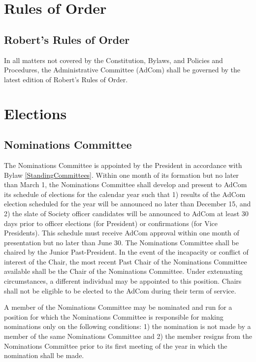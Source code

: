 \documentclass[10pt]{article}
\newcommand{\blref}[1]{Bylaw \ref{#1}}
\begin{document}
\tableofcontents

\section{Rules of Order}
\subsection{Robert's Rules of Order}

In all matters not covered by the Constitution, Bylaws, and Policies and Procedures, the Administrative Committee (AdCom) shall be governed by the latest edition of Robert's Rules of Order.

\section{Elections}
\subsection{Nominations Committee}
\label{Elections:NominationsCommittee}

The Nominations Committee is appointed by the President in accordance with \blref{StandingCommittees}. Within one month of its formation but no later than March 1, the Nominations Committee shall develop and present to AdCom its schedule of elections for the calendar year such that 1) results of the AdCom election scheduled for the year will be announced no later than December 15, and 2) the slate of Society officer candidates will be announced to AdCom at least 30 days prior to officer elections (for President) or confirmations (for Vice Presidents). This schedule must receive AdCom approval within one month of presentation but no later than June 30. The Nominations Committee shall be chaired by the Junior Past-President.  In the event of the incapacity or conflict of interest of the Chair, the most recent Past Chair of the Nominations Committee available shall be the Chair of the Nominations Committee.  Under extenuating circumstances, a different individual may be appointed to this position.  Chairs shall not be eligible to be elected to the AdCom during their term of service.

A member of the Nominations Committee may be nominated and run for a position for which the Nominations Committee is responsible for making nominations only on the following conditions: 1) the nomination is not made by a member of the same Nominations Committee and 2) the member resigns from the Nominations Committee prior to its first meeting of the year in which the nomination shall be made.
\end{document}
